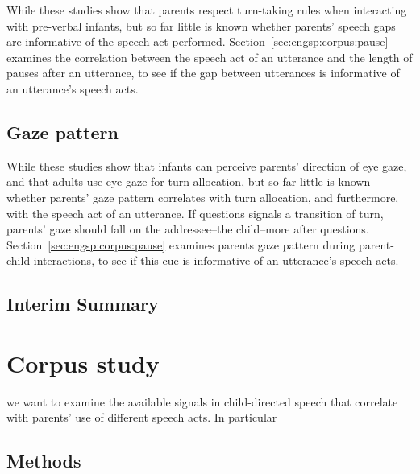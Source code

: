 While these studies show that parents respect turn-taking rules when interacting with pre-verbal infants, but so far little is known whether parents' speech gaps are informative of the speech act performed. Section~\ref{sec:engsp:corpus:pause} examines the correlation between the speech act of an utterance and the length of pauses after an utterance, to see if the gap between utterances is informative of an utterance's speech acts. 

\subsection{Gaze pattern}
\label{sec:engsp:bg:gaze}

While these studies show that infants can perceive parents' direction of eye gaze, and that adults use eye gaze for turn allocation, but so far little is known whether parents' gaze pattern correlates with turn allocation, and furthermore, with the speech act of an utterance. If questions signals a transition of turn, parents' gaze should fall on the addressee--the child--more after questions. Section~\ref{sec:engsp:corpus:pause} examines parents gaze pattern during parent-child interactions, to see if this cue is informative of an utterance's speech acts.

\subsection{Interim Summary}
\label{sec:engsp:bg:summary}

\section{Corpus study}
\label{sec:engsp:corpus}


we want to examine the available signals in child-directed speech that correlate with parents' use of different speech acts. In particular

\subsection{Methods}
\label{sec:engsp:corpus:method}

